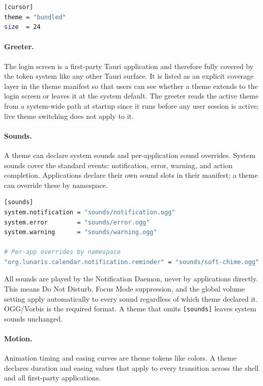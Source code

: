 \begin{lstlisting}[language=bash, caption={Cursor theme declaration}]
[cursor]
theme = "bundled"
size  = 24
\end{lstlisting}

\paragraph{Greeter.}
The login screen is a first-party Tauri application and therefore fully
covered by the token system like any other Tauri surface. It is listed as an
explicit coverage layer in the theme manifest so that users can see whether a
theme extends to the login screen or leaves it at the system default. The
greeter reads the active theme from a system-wide path at startup since it
runs before any user session is active; live theme switching does not apply
to it.

\paragraph{Sounds.}
A theme can declare system sounds and per-application sound overrides. System
sounds cover the standard events: notification, error, warning, and action
completion. Applications declare their own sound slots in their manifest; a
theme can override these by namespace.

\begin{lstlisting}[language=bash, caption={Sound theme declaration}]
[sounds]
system.notification = "sounds/notification.ogg"
system.error        = "sounds/error.ogg"
system.warning      = "sounds/warning.ogg"

# Per-app overrides by namespace
"org.lunaris.calendar.notification.reminder" = "sounds/soft-chime.ogg"
\end{lstlisting}

All sounds are played by the Notification Daemon, never by applications
directly. This means Do Not Disturb, Focus Mode suppression, and the global
volume setting apply automatically to every sound regardless of which theme
declared it. OGG/Vorbis is the required format. A theme that omits
\texttt{[sounds]} leaves system sounds unchanged.

\paragraph{Motion.}
Animation timing and easing curves are theme tokens like colors. A theme
declares duration and easing values that apply to every transition across the
shell and all first-party applications.

